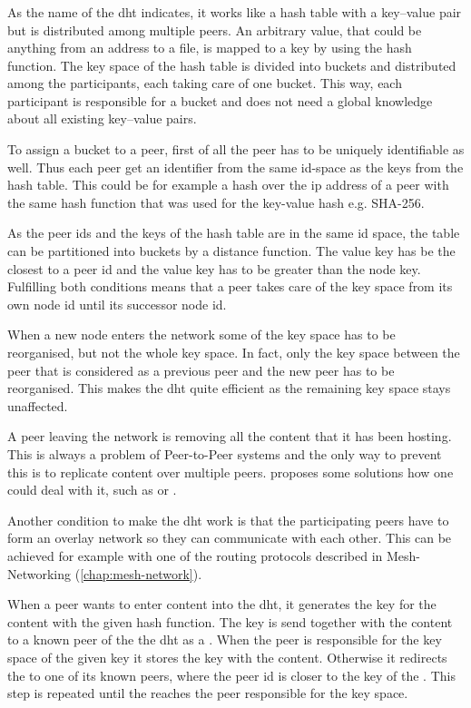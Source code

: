 \subsubsection{}
As the name of the \gls{dht} indicates, it works like a hash table with a key–value pair but is distributed among multiple peers. An arbitrary value, that could be anything from an address to a file, is mapped to a key by using the hash function. The key space of the hash table is divided into buckets and distributed among the participants, each taking care of one bucket. This way, each participant is responsible for a bucket and does not need a global knowledge about all existing key–value pairs.

To assign a bucket to a peer, first of all the peer has to be uniquely identifiable as well. Thus each peer get an identifier from the same id-space as the keys from the hash table. This could be for example a hash over the \gls{ip} address of a peer with the same hash function that was used for the key-value hash e.g. SHA-256.

As the peer ids and the keys of the hash table are in the same id space, the table can be partitioned into buckets by a distance function. The value key has be the closest to a peer id and the value key has to be greater than the node key. Fulfilling both conditions means that a peer takes care of the key space from its own node id until its successor node id.

When a new node enters the network some of the key space has to be reorganised, but not the whole key space. In fact, only the key space between the peer that is considered as a previous peer and the new peer has to be reorganised. This makes the \gls{dht} quite efficient as the remaining key space stays unaffected. 

A peer leaving the network is removing all the content that it has been hosting. This is always a problem of Peer-to-Peer systems and the only way to prevent this is to replicate content over multiple peers. \citet[\S3]{chord} proposes some solutions how one could deal with it, such as  or .

Another condition to make the \gls{dht} work is that the participating peers have to form an overlay network so they can communicate with each other. This can be achieved for example with one of the routing protocols described in Mesh-Networking (\vref{chap:mesh-network}).

When a peer wants to enter content into the \gls{dht}, it generates the key for the content with the given hash function. The key is send together with the content to a known peer of the the \gls{dht} as a . When the peer is responsible for the key space of the given key it stores the key with the content. Otherwise it redirects the  to one of its known peers, where the peer id is closer to the key of the . This step is repeated until the  reaches the peer responsible for the key space.

